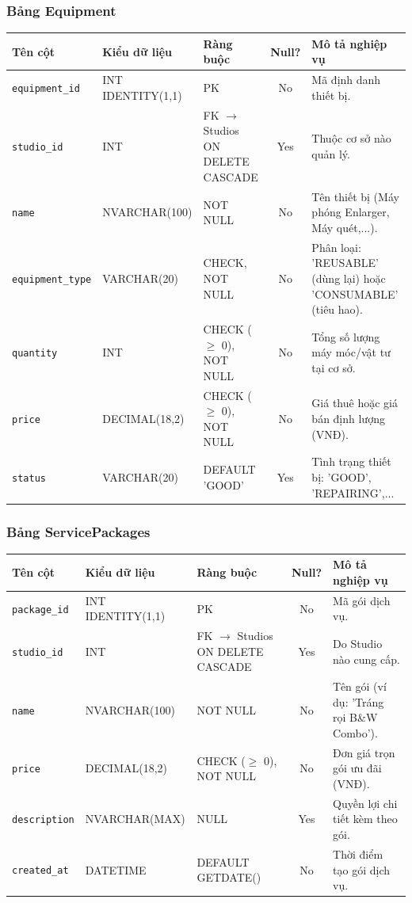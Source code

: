 \subsubsection{Bảng Equipment}
\begin{table}[H]
\centering
\small
\begin{tabularx}{\textwidth}{l l l c X}
\toprule
\textbf{Tên cột} & \textbf{Kiểu dữ liệu} & \textbf{Ràng buộc} & \textbf{Null?} & \textbf{Mô tả nghiệp vụ} \\
\midrule
\texttt{equipment\_id} & INT IDENTITY(1,1) & PK & No & Mã định danh thiết bị. \\
\texttt{studio\_id} & INT & FK $\rightarrow$ Studios ON DELETE CASCADE & Yes & Thuộc cơ sở nào quản lý. \\
\texttt{name} & NVARCHAR(100) & NOT NULL & No & Tên thiết bị (Máy phóng Enlarger, Máy quét,...). \\
\texttt{equipment\_type}& VARCHAR(20) & CHECK, NOT NULL & No & Phân loại: 'REUSABLE' (dùng lại) hoặc 'CONSUMABLE' (tiêu hao). \\
\texttt{quantity} & INT & CHECK ($\ge$ 0), NOT NULL & No & Tổng số lượng máy móc/vật tư tại cơ sở. \\
\texttt{price} & DECIMAL(18,2) & CHECK ($\ge$ 0), NOT NULL & No & Giá thuê hoặc giá bán định lượng (VNĐ). \\
\texttt{status} & VARCHAR(20) & DEFAULT 'GOOD' & Yes & Tình trạng thiết bị: 'GOOD', 'REPAIRING',... \\
\bottomrule
\end{tabularx}
\end{table}

\subsubsection{Bảng ServicePackages}
\begin{table}[H]
\centering
\small
\begin{tabularx}{\textwidth}{l l l c X}
\toprule
\textbf{Tên cột} & \textbf{Kiểu dữ liệu} & \textbf{Ràng buộc} & \textbf{Null?} & \textbf{Mô tả nghiệp vụ} \\
\midrule
\texttt{package\_id} & INT IDENTITY(1,1) & PK & No & Mã gói dịch vụ. \\
\texttt{studio\_id} & INT & FK $\rightarrow$ Studios ON DELETE CASCADE & Yes & Do Studio nào cung cấp. \\
\texttt{name} & NVARCHAR(100) & NOT NULL & No & Tên gói (ví dụ: 'Tráng rọi B\&W Combo'). \\
\texttt{price} & DECIMAL(18,2) & CHECK ($\ge$ 0), NOT NULL & No & Đơn giá trọn gói ưu đãi (VNĐ). \\
\texttt{description} & NVARCHAR(MAX) & NULL & Yes & Quyền lợi chi tiết kèm theo gói. \\
\texttt{created\_at} & DATETIME & DEFAULT GETDATE() & No & Thời điểm tạo gói dịch vụ. \\
\bottomrule
\end{tabularx}
\end{table}


